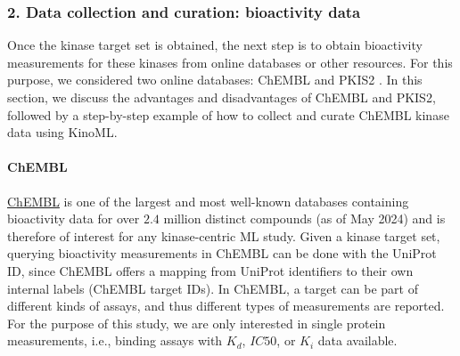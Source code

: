 \documentclass[9pt,lessons]{livecoms}
\begin{document}
\subsubsection{2. Data collection and curation: bioactivity data}

Once the kinase target set is obtained, the next step is to obtain bioactivity measurements for these kinases from online databases or other resources. 
For this purpose, we considered two online databases: ChEMBL \cite{zdrazil2023chembl} and PKIS2 \cite{drewry2017progress}. 
In this section, we discuss the advantages and disadvantages of ChEMBL and PKIS2, followed by a step-by-step example of how to collect and curate ChEMBL kinase data using KinoML.


\paragraph{ChEMBL}
\hyperlink{https://www.ebi.ac.uk/chembl/}{ChEMBL} \cite{zdrazil2023chembl} is one of the largest and most well-known databases containing bioactivity data for over $2.4$ million distinct compounds (as of May 2024) and is therefore of interest for any kinase-centric ML study. Given a kinase target set, querying bioactivity measurements in ChEMBL can be done with the UniProt ID, since ChEMBL offers a mapping from UniProt identifiers to their own internal labels (ChEMBL target IDs). 
In ChEMBL, a target can be part of different kinds of assays, and thus different types of measurements are reported.
For the purpose of this study, we are only interested in single protein measurements, i.e., binding assays with $K_d$, $IC50$, or $K_i$ data available.
\end{document}
